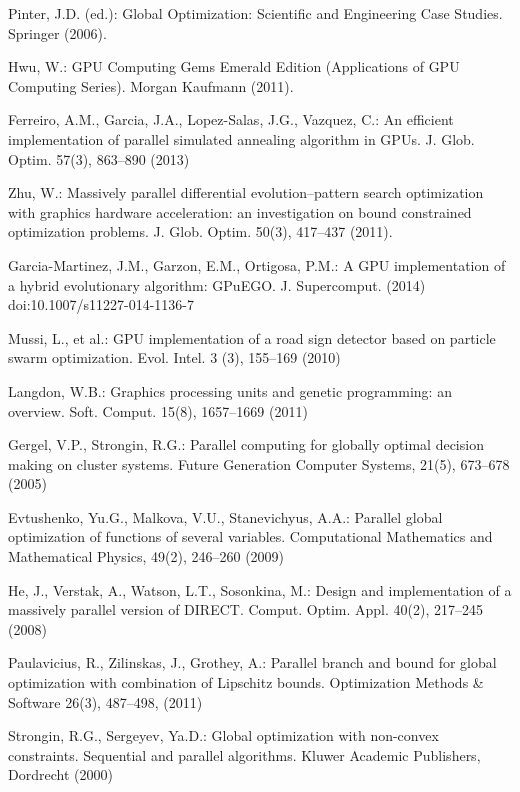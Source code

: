 \documentclass[smallcondensed]{svjour3}     %
\begin{document}
\begin{thebibliography}{}

Pinter, J.D. (ed.): Global Optimization: Scientific and Engineering Case Studies. Springer (2006).

Hwu, W.: GPU Computing Gems Emerald Edition (Applications of GPU Computing Series). Morgan Kaufmann (2011).

Ferreiro, A.M., Garcia, J.A., Lopez-Salas, J.G., Vazquez, C.: An efficient implementation of parallel simulated annealing algorithm in GPUs. J. Glob. Optim. 57(3), 863--890 (2013)

Zhu, W.: Massively parallel differential evolution--pattern search optimization with graphics hardware acceleration: an investigation on bound constrained optimization problems. J. Glob. Optim. 50(3), 417--437 (2011).

Garcia-Martinez, J.M., Garzon, E.M., Ortigosa, P.M.: A GPU implementation of a hybrid evolutionary algorithm: GPuEGO. J. Supercomput. (2014) doi:10.1007/s11227-014-1136-7 

Mussi, L., et al.: GPU implementation of a road sign detector based on particle swarm optimization. Evol. Intel. 3 (3), 155--169 (2010)

Langdon, W.B.: Graphics processing units and genetic programming: an overview. Soft. Comput. 15(8), 1657--1669 (2011)

Gergel, V.P., Strongin, R.G.: Parallel computing for globally optimal decision making on cluster systems. Future Generation Computer Systems, 21(5), 673--678 (2005)

Evtushenko, Yu.G., Malkova, V.U., Stanevichyus, A.A.: Parallel global optimization of functions of several variables. Computational Mathematics and Mathematical Physics, 49(2), 246--260 (2009)

He, J., Verstak, A., Watson, L.T., Sosonkina, M.: Design and implementation of a massively parallel version of DIRECT. Comput. Optim. Appl. 40(2), 217--245 (2008)

Paulavicius, R., Zilinskas, J., Grothey, A.: Parallel branch and bound for global optimization with combination of Lipschitz bounds. Optimization Methods \& Software 26(3), 487--498, (2011)

Strongin, R.G., Sergeyev, Ya.D.: Global optimization with non-convex constraints. Sequential and parallel algorithms. Kluwer Academic Publishers, Dordrecht (2000)


\end{thebibliography}
\end{document}
